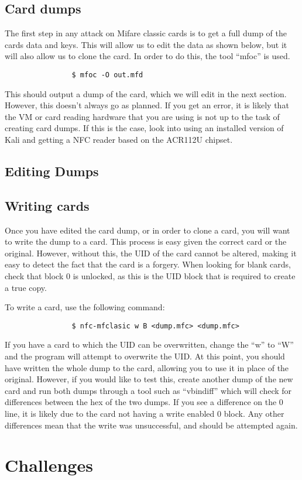 		\subsection{Card dumps}
			The first step in any attack on Mifare classic cards is to get a full dump of the cards data and keys.
			This will allow us to edit the data as shown below, but it will also allow us to clone the card.
			In order to do this, the tool ``mfoc'' is used.
			\begin{verbatim}
				$ mfoc -O out.mfd
			\end{verbatim}
			This should output a dump of the card, which we will edit in the next section.
			However, this doesn't always go as planned.
			If you get an error, it is likely that the VM or card reading hardware that you are using is not up to the task of creating card dumps.
			If this is the case, look into using an installed version of Kali and getting a NFC reader based on the ACR112U chipset.
		\subsection{Editing Dumps}
		\subsection{Writing cards}
			Once you have edited the card dump, or in order to clone a card, you will want to write the dump to a card.
			This process is easy given the correct card or the original.
			However, without this, the UID of the card cannot be altered, making it easy to detect the fact that the card is a forgery.
			When looking for blank cards, check that block 0 is unlocked, as this is the UID block that is required to create a true copy.

			To write a card, use the following command:
			\begin{verbatim}
				$ nfc-mfclasic w B <dump.mfc> <dump.mfc>
			\end{verbatim}
			If you have a card to which the UID can be overwritten, change the ``w'' to ``W'' and the program will attempt to overwrite the UID.
			At this point, you should have written the whole dump to the card, allowing you to use it in place of the original.
			However, if you would like to test this, create another dump of the new card and run both dumps through a tool such as ``vbindiff'' which will check for differences between the hex of the two dumps.
			If you see a difference on the 0 line, it is likely due to the card not having a write enabled 0 block.
			Any other differences mean that the write was unsuccessful, and should be attempted again.
	\section{Challenges}
